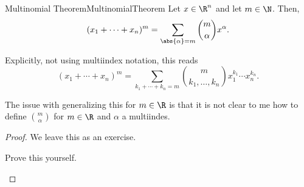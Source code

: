 \begin{thm}{Multinomial Theorem}{MultinomialTheorem}
Let $x\in \R ^n$ and let $m\in \N$.  Then,
\begin{equation}
(x_1+\cdots +x_n)^m=\sum _{\abs{\alpha}=m}\binom{m}{\alpha}x^{\alpha}.
\end{equation}
\begin{rmk}
Explicitly, not using multiindex notation, this reads
\begin{equation*}
(x_1+\cdots +x_n)^m=\sum _{k_1+\cdots +k_n=m}\binom{m}{k_1,\ldots ,k_n}x_1^{k_1}\cdots x_n^{k_n}.
\end{equation*}
\end{rmk}
\begin{rmk}
	The issue with generalizing this for $m\in \R$ is that it is not clear to me how to define $\binom{m}{\alpha}$ for $m\in \R$ and $\alpha$ a multiindes.
\end{rmk}
\begin{proof}
We leave this as an exercise.
\begin{exr}[breakable=false]{}{}
Prove this yourself.
\end{exr}
\end{proof}
\end{thm}

